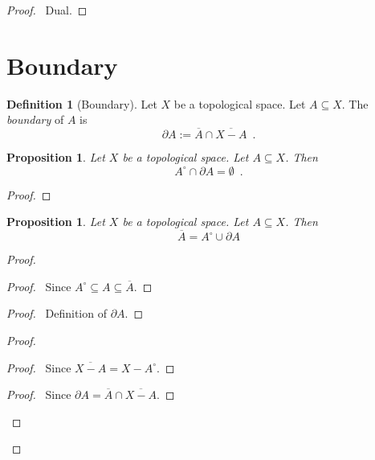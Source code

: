\documentclass{book}
\let\qed\relax
\newtheorem{prop}[ax]{Proposition}
\theoremstyle{definition}
\newtheorem{df}[ax]{Definition}
\begin{document}
\begin{proof}
\pf\ Dual. \qed
\end{proof}

\section{Boundary}

\begin{df}[Boundary]
Let $X$ be a topological space. Let $A \subseteq X$. The \emph{boundary} of $A$ is
\[ \partial A := \overline{A} \cap \overline{X - A} \enspace . \]
\end{df}

\begin{prop}
Let $X$ be a topological space. Let $A \subseteq X$. Then
\[ A^\circ \cap \partial A = \emptyset \enspace . \]
\end{prop}

\begin{proof}
\pf
{}
\qed
\end{proof}

\begin{prop}
\label{prop:closure_boundary}
Let $X$ be a topological space. Let $A \subseteq X$. Then
\[ \overline{A} = A^\circ \cup \partial A \]
\end{prop}

\begin{proof}
\begin{proof}
	\pf\ Since $A^\circ \subseteq A \subseteq \overline{A}$.
\end{proof}
\begin{proof}
	\pf\ Definition of $\partial A$.
\end{proof}
\begin{proof}
	\begin{proof}
		\pf\ Since $\overline{X-A} = X - A^\circ$.
	\end{proof}
	\begin{proof}
		\pf\ Since $\partial A = \overline{A} \cap \overline{X-A}$.
	\end{proof}
\end{proof}
\qed
\end{proof}
\end{document}
